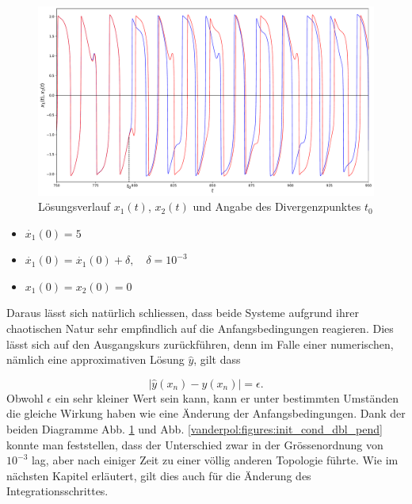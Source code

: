 \begin{figure}
\includegraphics[width=\textwidth]{papers/vanderpol/figures/initial_cond_VDP.pdf}
\caption{Lösungsverlauf $x_1(t)$, $x_2(t)$ und Angabe des Divergenzpunktes $t_0$ \label{vanderpol:figures:init_cond_VDP}}
\end{figure}

\begin{itemize}
\item
$\dot{x_1}(0) = 5$
\item
$\dot{x_1}(0) = \dot{x_1}(0) + \delta, \quad \delta = 10^{-3}$ 
\item
$x_1(0) = x_2(0) = 0$
\end{itemize}
Daraus lässt sich natürlich schliessen, dass beide Systeme aufgrund ihrer chaotischen Natur sehr empfindlich auf die Anfangsbedingungen reagieren. Dies lässt sich auf den Ausgangskurs zurückführen, denn im Falle einer numerischen, nämlich eine approximativen Lösung $\hat{y}$, gilt dass

\begin{equation} 
|\hat{y}(x_n) - y(x_n)| = \epsilon.
\end{equation}
Obwohl $\epsilon$ ein sehr kleiner Wert sein kann, kann er unter bestimmten Umständen die gleiche Wirkung haben wie eine Änderung der Anfangsbedingungen. Dank der beiden Diagramme Abb.   \ref{vanderpol:figures:init_cond_VDP} und Abb. \ref{vanderpol:figures:init_cond_dbl_pend} konnte man feststellen, dass der Unterschied zwar in der Grössenordnung von $10^{-3}$ lag, aber nach einiger Zeit zu einer völlig anderen Topologie führte. Wie im nächsten Kapitel erläutert, gilt dies auch für die Änderung des Integrationsschrittes.

